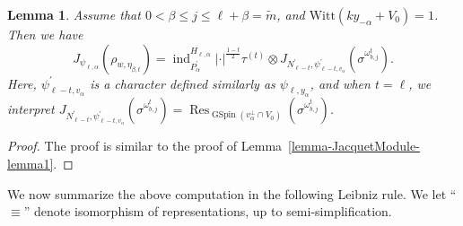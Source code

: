 \documentclass[12pt]{amsart}
\newcommand{\Res}{\operatorname{Res}}
\newcommand{\ind}{\operatorname{ind}}
\newcommand{\wt}{\widetilde}
\newtheorem{lemma}[theorem]{Lemma}
\theoremstyle{remark}
\DeclareMathOperator{\GSpin}{GSpin}
\begin{document}
\begin{lemma}
\label{lemma-JacquetModule-gamma-lemma22}
Assume that $0< \beta\le j \le \ell+\beta= \wt m$, and $\mathrm{Witt}(k y_{-\alpha}+V_0)=1$.  Then we have
\begin{equation*}
	J_{\psi_{\ell,\alpha}}(	\rho_{w,\eta_{\beta,t}} ) = \ind_{P_{\alpha}^{\prime}}^{H_{\ell,\alpha}} |\cdot|^{\frac{1-t}{2}} \tau^{(t)}\otimes  J_{N_{\ell-t}^\prime, \psi_{\ell-t,v_\alpha} ^\prime}(\sigma^{\omega_{b,j}^t}).
\end{equation*}
Here, $\psi_{\ell-t,v_\alpha} ^\prime$ is a character defined similarly as $\psi_{\ell,y_{\alpha}}$, and
when $t=\ell$, we interpret $J_{N_{\ell-t}^\prime, \psi_{\ell-t,v_\alpha} ^\prime}(\sigma^{\omega_{b,j}^t})=\Res_{\GSpin(v_\alpha^\perp \cap V_0)}(\sigma^{\omega_{b,j}^t})$.
\end{lemma}
\begin{proof}
 The proof is similar to the proof of Lemma~\ref{lemma-JacquetModule-lemma1}. 
\end{proof}


We now summarize the above computation in the following Leibniz rule. We let ``$\equiv$'' denote isomorphism of representations, up to semi-simplification.
 
\end{document}
